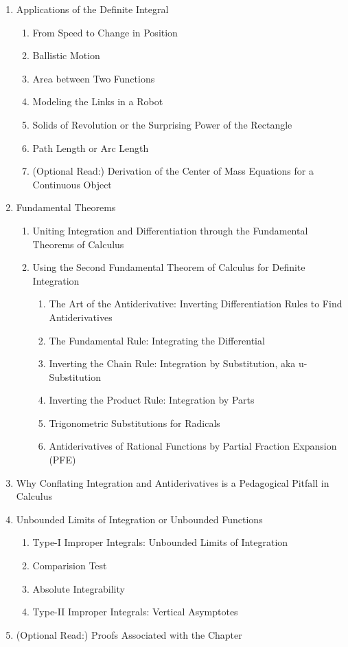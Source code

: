 \begin{enumerate}
  \item Applications of the Definite Integral 
  \begin{enumerate}
  \item From Speed to Change in Position 
  \item Ballistic Motion 
  \item Area between Two Functions 
  \item Modeling the Links in a Robot 
  \item Solids of Revolution or the Surprising Power of the Rectangle 
     \item Path Length or Arc Length 
  \item (Optional Read:) Derivation of the Center of Mass Equations for a Continuous Object 
\end{enumerate}
   \item Fundamental Theorems 
  \begin{enumerate}
  \item Uniting Integration and Differentiation through the Fundamental Theorems of Calculus 

  \item Using the Second Fundamental Theorem of Calculus for Definite Integration 
  \begin{enumerate}
\item The Art of the Antiderivative: Inverting Differentiation Rules to Find Antiderivatives 
  \item The Fundamental Rule: Integrating the Differential   
  \item Inverting the Chain Rule: Integration by Substitution, aka u-Substitution 
  \item Inverting the Product Rule: Integration by Parts 
  \item Trigonometric Substitutions for Radicals 
    \item Antiderivatives of Rational Functions by Partial Fraction Expansion (PFE) 
  \end{enumerate}


\end{enumerate}
\item Why Conflating Integration and Antiderivatives is a Pedagogical Pitfall in Calculus 
\item Unbounded Limits of Integration or Unbounded Functions 
\begin{enumerate}
  \item Type-I Improper Integrals: Unbounded Limits of Integration 
    \item Comparision Test 
  \item Absolute Integrability 
  \item Type-II Improper Integrals: Vertical Asymptotes 
\end{enumerate}

  \item (Optional Read:) Proofs Associated with the Chapter
\end{enumerate}

